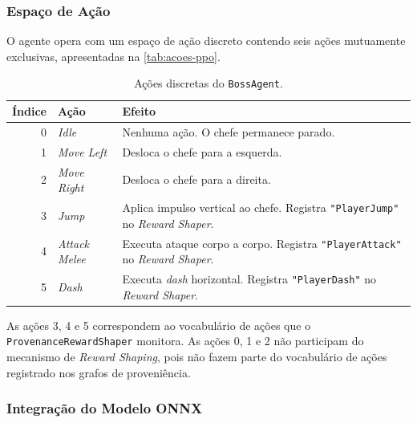 \subsubsection{Espaço de Ação}

O agente opera com um espaço de ação discreto contendo seis ações mutuamente
exclusivas, apresentadas na \autoref{tab:acoes-ppo}.

\begin{table}[htb]
    \centering
    \caption{Ações discretas do \texttt{BossAgent}.}
    \label{tab:acoes-ppo}
    \begin{tabular}{r l p{7cm}}
        \toprule
        \textbf{Índice} & \textbf{Ação}          & \textbf{Efeito} \\
        \midrule
        0 & \textit{Idle}          & Nenhuma ação. O chefe permanece parado. \\
        1 & \textit{Move Left}     & Desloca o chefe para a esquerda. \\
        2 & \textit{Move Right}    & Desloca o chefe para a direita. \\
        3 & \textit{Jump}          & Aplica impulso vertical ao chefe. Registra
                                     \texttt{"PlayerJump"} no \textit{Reward
                                     Shaper}. \\
        4 & \textit{Attack Melee}  & Executa ataque corpo a corpo. Registra
                                     \texttt{"PlayerAttack"} no \textit{Reward
                                     Shaper}. \\
        5 & \textit{Dash}          & Executa \textit{dash} horizontal. Registra
                                     \texttt{"PlayerDash"} no \textit{Reward
                                     Shaper}. \\
        \bottomrule
    \end{tabular}
\end{table}

As ações 3, 4 e 5 correspondem ao vocabulário de ações que o
\texttt{ProvenanceRewardShaper} monitora. As ações 0, 1 e 2 não participam
do mecanismo de \textit{Reward Shaping}, pois não fazem parte do vocabulário
de ações registrado nos grafos de proveniência.

\subsubsection{Integração do Modelo ONNX}

